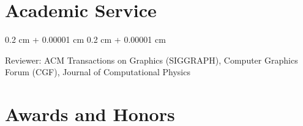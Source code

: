 \documentclass[10pt, letterpaper]{article}
\newenvironment{onecolentry}{
    \begin{adjustwidth}{
        0.2 cm + 0.00001 cm
    }{
        0.2 cm + 0.00001 cm
    }
}{
    \end{adjustwidth}
} %
\newenvironment{twocolentry}[2][]{
    \onecolentry
    \def\secondColumn{#2}
    \setcolumnwidth{\fill, 4.5 cm}
    \begin{paracol}{2}
}{
    \switchcolumn \raggedleft \secondColumn
    \end{paracol}
    \endonecolentry
} %
\begin{document}





        
    \section{Academic Service}
    
    \begin{onecolentry}
        Reviewer: ACM Transactions on Graphics (SIGGRAPH), Computer Graphics Forum (CGF), Journal of Computational Physics
    \end{onecolentry}
    


\section{Awards and Honors}
\end{document}
